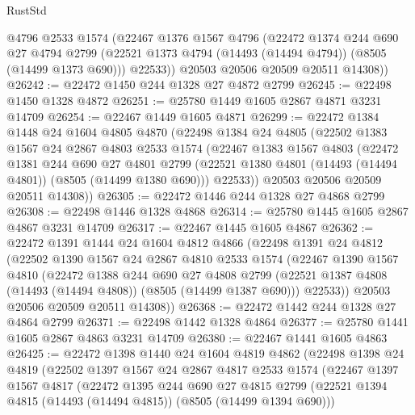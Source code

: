 \begin{lexlean}{RustStd}
\begin{coremodule}
        @4796
        @2533
        @1574
        (@22467
          @1376
          @1567
          @4796
          (@22472
            @1374
            @244
            @690
            @27
            @4794
            @2799
            (@22521 @1373 @4794 (@14493 (@14494 @4794)) (@8505 (@14499 @1373 @690)))
            @22533))
        @20503
        @20506
        @20509
        @20511
        @14308))
@26242 := @22472 @1450 @244 @1328 @27 @4872 @2799
@26245 := @22498 @1450 @1328 @4872
@26251 := @25780 @1449 @1605 @2867 @4871 @3231 @14709
@26254 := @22467 @1449 @1605 @4871
@26299 := @22472
    @1384
    @1448
    @24
    @1604
    @4805
    @4870
    (@22498
      @1384
      @24
      @4805
      (@22502
        @1383
        @1567
        @24
        @2867
        @4803
        @2533
        @1574
        (@22467
          @1383
          @1567
          @4803
          (@22472
            @1381
            @244
            @690
            @27
            @4801
            @2799
            (@22521 @1380 @4801 (@14493 (@14494 @4801)) (@8505 (@14499 @1380 @690)))
            @22533))
        @20503
        @20506
        @20509
        @20511
        @14308))
@26305 := @22472 @1446 @244 @1328 @27 @4868 @2799
@26308 := @22498 @1446 @1328 @4868
@26314 := @25780 @1445 @1605 @2867 @4867 @3231 @14709
@26317 := @22467 @1445 @1605 @4867
@26362 := @22472
    @1391
    @1444
    @24
    @1604
    @4812
    @4866
    (@22498
      @1391
      @24
      @4812
      (@22502
        @1390
        @1567
        @24
        @2867
        @4810
        @2533
        @1574
        (@22467
          @1390
          @1567
          @4810
          (@22472
            @1388
            @244
            @690
            @27
            @4808
            @2799
            (@22521 @1387 @4808 (@14493 (@14494 @4808)) (@8505 (@14499 @1387 @690)))
            @22533))
        @20503
        @20506
        @20509
        @20511
        @14308))
@26368 := @22472 @1442 @244 @1328 @27 @4864 @2799
@26371 := @22498 @1442 @1328 @4864
@26377 := @25780 @1441 @1605 @2867 @4863 @3231 @14709
@26380 := @22467 @1441 @1605 @4863
@26425 := @22472
    @1398
    @1440
    @24
    @1604
    @4819
    @4862
    (@22498
      @1398
      @24
      @4819
      (@22502
        @1397
        @1567
        @24
        @2867
        @4817
        @2533
        @1574
        (@22467
          @1397
          @1567
          @4817
          (@22472
            @1395
            @244
            @690
            @27
            @4815
            @2799
            (@22521 @1394 @4815 (@14493 (@14494 @4815)) (@8505 (@14499 @1394 @690)))

\end{coremodule}
\end{lexlean}
